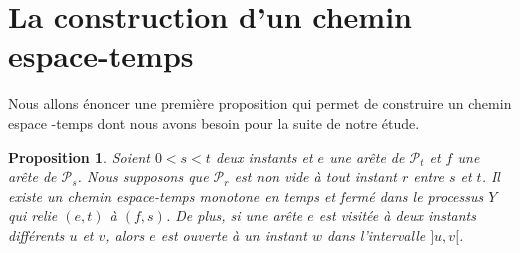\documentclass[titlepage,a4paper,12pt]{article}
\newcounter{th}
\newcounter{propo}
\newtheorem{prop}[propo]{Proposition}
\begin{document}
\section{La construction d'un chemin espace-temps}
Nous allons énoncer une première proposition qui permet de construire un chemin espace -temps dont nous avons besoin pour la suite de notre étude.

\begin{prop} \label{stc}Soient $0<s<t$ deux instants et $e$ une arête de $ \mathcal{P}_t$ et $f$ une arête de $\mathcal{P}_s$. Nous supposons que $\mathcal{P}_r$ est non vide à tout instant $r$ entre $s$ et $t$. Il existe un chemin espace-temps monotone en temps et fermé dans le processus $Y$ qui relie $(e,t)$ à $(f,s)$. De plus, si une arête $e$ est visitée à deux instants différents $u$ et $v$, alors $e$ est ouverte à un instant $w$ dans l'intervalle $]u,v[$.
\end{prop}
\end{document}
